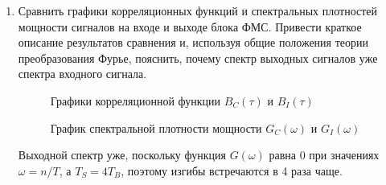 \documentclass[a4paper, 12pt]{article}
\begin{document}
\begin{enumerate}
  \item Сравнить графики корреляционных функций и спектральных 
  плотностей мощности сигналов на входе и выходе блока ФМС. 
  Привести краткое описание результатов сравнения и, 
  используя общие положения теории преобразования Фурье, 
  пояснить, почему спектр выходных сигналов уже спектра входного 
  сигнала.

  \begin{figure}[H]
    \centering
    \caption{Графики корреляционной функции $B_C(\tau)$ и $B_I(\tau)$}
  \end{figure}

  \begin{figure}[H]
    \centering
    \caption{График спектральной плотности мощности 
    $G_C(\omega)$ и $G_I(\omega)$}
  \end{figure}

  Выходной спектр уже, поскольку функция $G(\omega)$ равна
  0 при значениях $\omega = n/T$, а $T_S=4T_B$, поэтому
  изгибы встречаются в 4 раза чаще.
\end{enumerate}
\end{document}
